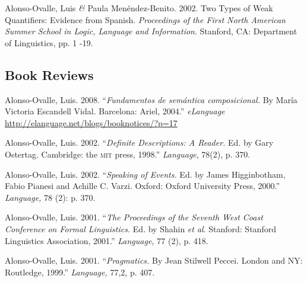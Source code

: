 \documentclass[11pt]{article}
\begin{document}

Alonso-Ovalle, Luis \textit{\&} Paula Men\'endez-Benito. 2002. Two Types of Weak Quantifiers: Evidence from Spanish. \textit{Proceedings of the First North American Summer School in Logic, Language and Information}. Stanford, CA: Department of Linguistics, pp. 1 -19. 



\subsection*{Book Reviews}
Alonso-Ovalle, Luis. 2008. ``\textit{Fundamentos de sem\'antica composicional.} By Mar\'ia Victoria Escandell Vidal. Barcelona: Ariel, 2004.''  \textit{eLanguage} {\footnotesize \href{http://elanguage.net/blogs/booknotices/?p=17}{http://elanguage.net/blogs/booknotices/?p=17}}

Alonso-Ovalle, Luis. 2002. ``\textit{Definite Descriptions: A Reader.} Ed. by Gary Ostertag. Cambridge: the \textsc{mit} press, 1998.''  \textit{Language}, 78(2), p. 370.

Alonso-Ovalle, Luis. 2002. ``\textit{Speaking of Events.} Ed. by James Higginbotham, Fabio Pianesi and Achille C. Varzi. Oxford: Oxford University Press, 2000.'' \textit{Language,} 78 (2): p. 370.

Alonso-Ovalle, Luis. 2001. ``\textit{The Proceedings of the Seventh West Coast Conference on Formal Linguistics.} Ed. by Shahin \textit{et al}. Stanford: Stanford Linguistics Association, 2001.'' {\it Language,} 77 (2), p. 418.

Alonso-Ovalle, Luis. 2001. ``{\it Pragmatics.} By Jean Stilwell Peccei. London and NY: Routledge, 1999.'' {\it Language,} 77,2, p. 407.
\end{document}
